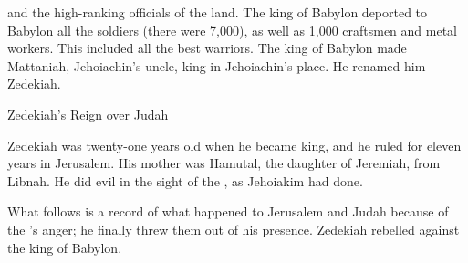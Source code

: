 {and the high-ranking officials
of the land.
The king
of Babylon
deported
to Babylon
all
the soldiers
(there were 7,000), as well as 1,000
craftsmen
and metal workers.
This included all
the best warriors.
The king
of Babylon
made Mattaniah,
Jehoiachin’s uncle,
king in Jehoiachin’s place.
He renamed him
Zedekiah.
\par }{\SH Zedekiah’s Reign over Judah
\par }{\PP {}Zedekiah
was twenty-one
years
old when he became king, and he ruled
for eleven
years
in Jerusalem.
His mother
was Hamutal,
the daughter
of Jeremiah,
from Libnah.
He did
evil
in the sight
of the
{}, as
Jehoiakim
had done.
\par }{\PP {}What follows is a record of what happened
to Jerusalem
and Judah
because
of the
{}’s
anger;
he finally
threw
them out of his presence.
Zedekiah
rebelled
against the king
of Babylon.

}

